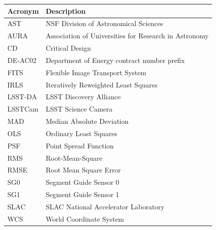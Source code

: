 \addtocounter{table}{-1}
\begin{longtable}{p{}p{}}\hline
\textbf{Acronym} & \textbf{Description}  \\\hline

AST & NSF Division of Astronomical Sciences \\\hline
AURA & Association of Universities for Research in Astronomy \\\hline
CD & Critical Design \\\hline
DE-AC02 & Department of Energy contract number prefix \\\hline
FITS & Flexible Image Transport System \\\hline
IRLS & Iteratively Reweighted Least Squares \\\hline
LSST-DA & LSST Discovery Alliance \\\hline
LSSTCam & LSST Science Camera \\\hline
MAD & Median Absolute Deviation \\\hline
OLS & Ordinary Least Squares \\\hline
PSF & Point Spread Function \\\hline
RMS & Root-Mean-Square \\\hline
RMSE & Root Mean Square Error \\\hline
SG0 & Segment Guide Sensor 0 \\\hline
SG1 & Segment Guide Sensor 1 \\\hline
SLAC & SLAC National Accelerator Laboratory \\\hline
WCS & World Coordinate System \\\hline
\end{longtable}
